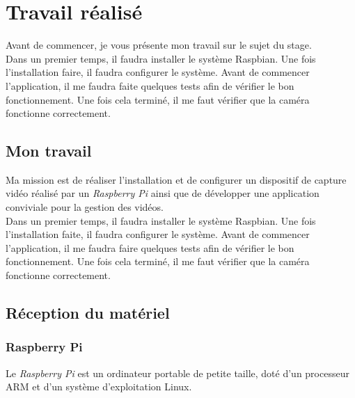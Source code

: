 \chapter{Travail réalisé}
Avant de commencer, je vous présente mon travail sur le sujet du stage.\\[0.2cm]
Dans un premier temps, il faudra installer le système Raspbian. Une fois l’installation faire, il faudra configurer le système. Avant de commencer l’application, il me faudra faite quelques tests afin de vérifier le bon fonctionnement. Une fois cela terminé, il me faut vérifier que la caméra fonctionne correctement.

    \section{Mon travail}
    \begin{flushleft}
        Ma mission est de réaliser l'installation et de configurer un dispositif de capture vidéo réalisé par un \textit{Raspberry Pi} ainsi que de développer une application conviviale pour la gestion des vidéos.\\[0.2cm]
    
        Dans un premier temps, il faudra installer le système Raspbian.
        Une fois l'installation faite, il faudra configurer le système.
        Avant de commencer l'application, il me faudra faire quelques tests afin de vérifier le bon fonctionnement.
        Une fois cela terminé, il me faut vérifier que la caméra fonctionne correctement.    
    \end{flushleft}

    \section{Réception du matériel}
        \subsection{Raspberry Pi}
        Le \textit{Raspberry Pi} est un ordinateur portable de petite taille, doté d'un processeur ARM et d'un système d'exploitation Linux.



